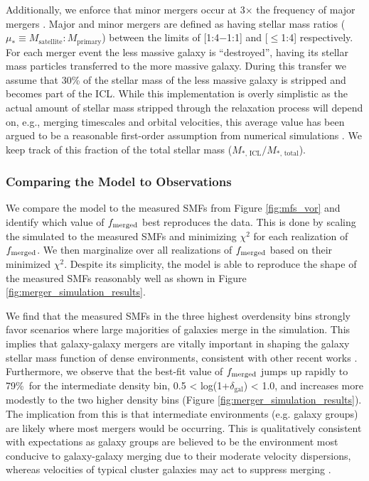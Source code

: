 \documentclass[a4paper,fleqn,usenatbib]{mnras}
\begin{document}
Additionally, we enforce that minor mergers occur at 3$\times$ the frequency of major mergers \citep{Lotz2011}.
Major  and minor mergers are defined as having stellar mass ratios ($\mu_* \equiv M_{\mathrm{satellite}} : M_{\mathrm{primary}}$) between the limits of [1:4$-$1:1] and [$\leq$1:4] respectively.
For each merger event the less massive galaxy is ``destroyed'', having its stellar mass particles transferred to the more massive galaxy.
During this transfer we assume that 30\% of the stellar mass of the less massive galaxy is stripped and becomes part of the ICL.
While this implementation is overly simplistic as the actual amount of stellar mass stripped through the relaxation process will depend on, e.g., merging timescales and orbital velocities, this average value has been argued to be a reasonable first-order assumption from numerical simulations \citep[][and references therein]{Somerville2008, Contini2014, Contini2017}.
We keep track of this fraction of the total stellar mass ($M_{*,\,\mathrm{ICL}} / M_{*,\,\mathrm{total}}$).



\subsubsection{Comparing the Model to Observations}


We compare the model to the measured SMFs from Figure \ref{fig:mfs_vor} and identify which value of $f_{\rm{merged}}$ best reproduces the data.
This is done by scaling the simulated to the measured SMFs and minimizing $\chi^2$ for each realization of $f_{\rm{merged}}$.
We then marginalize over all realizations of $f_{\rm{merged}}$ based on their minimized $\chi^2$.
Despite its simplicity, the model is able to reproduce the shape of the measured SMFs reasonably well as shown in Figure \ref{fig:merger_simulation_results}.


We find that the measured SMFs in the three highest overdensity bins strongly favor scenarios where large majorities of galaxies merge in the simulation.
This implies that galaxy-galaxy mergers are vitally important in shaping the galaxy stellar mass function of dense environments, consistent with other recent works \citep{Davidzon2016, Steinhardt2017}.
Furthermore, we observe that the best-fit value of $f_{\rm{merged}}$ jumps up rapidly to 79\%\ for the intermediate density bin, 0.5 < log(1+$\delta_{\mathrm{gal}}$) < 1.0, and increases more modestly to the two higher density bins (Figure \ref{fig:merger_simulation_results}).
The implication from this is that intermediate environments (e.g. galaxy groups) are likely where most mergers would be occurring.
This is qualitatively consistent with expectations as galaxy groups are believed to be the environment most conducive to galaxy-galaxy merging due to their moderate velocity dispersions, whereas velocities of typical cluster galaxies may act to suppress merging \citep{Lin2010}.
\end{document}
